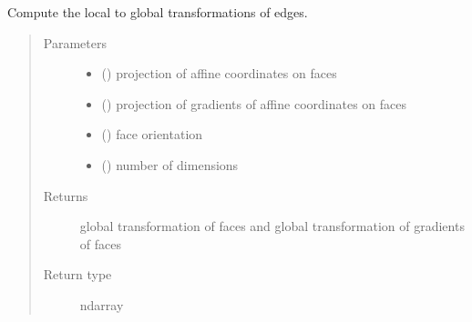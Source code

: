 \documentclass[letterpaper,10pt,english]{sphinxmanual}
\begin{document}
\begin{fulllineitems}
\label{\detokenize{petgem/hvfem:petgem.hvfem.OrientTri}}
Compute the local to global transformations of edges.
\begin{quote}\begin{description}
\item[{Parameters}] \leavevmode\begin{itemize}
\item {} 
 () \textendash{} projection of affine coordinates on faces

\item {} 
 () \textendash{} projection of gradients of affine coordinates on faces

\item {} 
 () \textendash{} face orientation

\item {} 
 () \textendash{} number of dimensions

\end{itemize}

\item[{Returns}] \leavevmode
global transformation of faces and global transformation of gradients of faces

\item[{Return type}] \leavevmode
ndarray

\end{description}\end{quote}

\end{fulllineitems}

\end{document}
